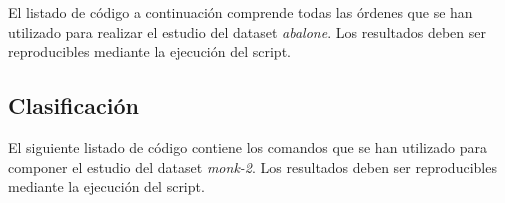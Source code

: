 \documentclass[a4paper, 11pt]{article}
\begin{document}
El listado de código a continuación comprende todas las órdenes que se han utilizado para realizar el estudio del dataset \textit{abalone}. Los resultados deben ser reproducibles mediante la ejecución del script.\newline


\subsection{Clasificación}
\label{sec:code:clas}

El siguiente listado de código contiene los comandos que se han utilizado para componer el estudio del dataset \textit{monk-2}. Los resultados deben ser reproducibles mediante la ejecución del script.

\end{document}
